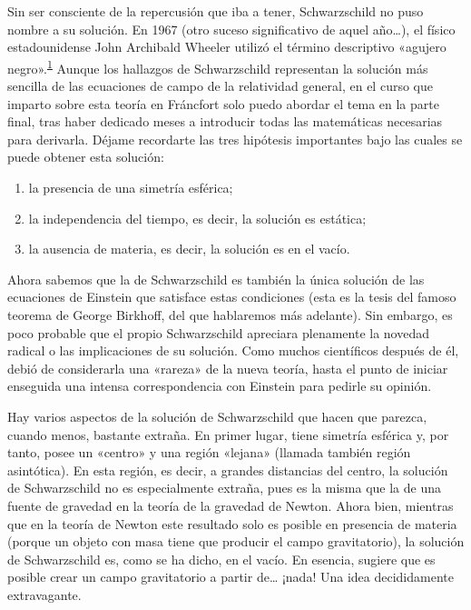Sin ser consciente de la repercusión que iba a tener, Schwarzschild no puso nombre a su solución. En 1967 (otro suceso significativo de aquel año…), el físico estadounidense John Archibald Wheeler utilizó el término descriptivo «agujero negro».\textsuperscript{\hyperlink{note:06-01}{1}} Aunque los hallazgos de Schwarzschild representan la solución más sencilla de las ecuaciones de campo de la relatividad general, en el curso que imparto sobre esta teoría en Fráncfort solo puedo abordar el tema en la parte final, tras haber dedicado meses a introducir todas las matemáticas necesarias para derivarla. Déjame recordarte las tres hipótesis importantes bajo las cuales se puede obtener esta solución:

\begin{enumerate}
\item la presencia de una simetría esférica;

\item la independencia del tiempo, es decir, la solución es estática;

\item la ausencia de materia, es decir, la solución es en el vacío.
\end{enumerate}

Ahora sabemos que la de Schwarzschild es también la única solución de las ecuaciones de Einstein que satisface estas condiciones (esta es la tesis del famoso teorema de George Birkhoff, del que hablaremos más adelante). Sin embargo, es poco probable que el propio Schwarzschild apreciara plenamente la novedad radical o las implicaciones de su solución. Como muchos científicos después de él, debió de considerarla una «rareza» de la nueva teoría, hasta el punto de iniciar enseguida una intensa correspondencia con Einstein para pedirle su opinión.

Hay varios aspectos de la solución de Schwarzschild que hacen que parezca, cuando menos, bastante extraña. En primer lugar, tiene simetría esférica y, por tanto, posee un «centro» y una región «lejana» (llamada también región asintótica). En esta región, es decir, a grandes distancias del centro, la solución de Schwarzschild no es especialmente extraña, pues es la misma que la de una fuente de gravedad en la teoría de la gravedad de Newton. Ahora bien, mientras que en la teoría de Newton este resultado solo es posible en presencia de materia (porque un objeto con masa tiene que producir el campo gravitatorio), la solución de Schwarzschild es, como se ha dicho, en el vacío. En esencia, sugiere que es posible crear un campo gravitatorio a partir de… ¡nada! Una idea decididamente extravagante.

